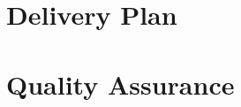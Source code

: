 \documentclass[12pt, letterpaper]{article}
\begin{document}
\section{Delivery Plan}

\section{Quality Assurance}
\end{document}
